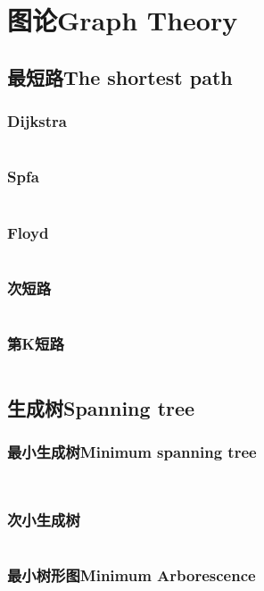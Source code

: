 \documentclass[twoside,sub3section,UTF8]{ctexart}						%
\begin{document}
\newpage
\section{图论Graph Theory}
	\subsection{最短路The shortest path}
		\subsubsection{Dijkstra}
		\inputminted[breaklines]{c++}{"Gragh Theory/The shortest path/dijkstra.cpp"}
		\subsubsection{Spfa}
		\inputminted[breaklines]{c++}{"Gragh Theory/The shortest path/spfa.cpp"}
		\subsubsection{Floyd}
		\inputminted[breaklines]{c++}{"Gragh Theory/The shortest path/floyd.cpp"}
		\subsubsection{次短路}
		\inputminted[breaklines]{c++}{"Gragh Theory/The shortest path/secdij.cpp"}
		\subsubsection{第K短路}
		\inputminted[breaklines]{c++}{"Gragh Theory/The shortest path/Astar.cpp"}

	\subsection{生成树Spanning tree}
		\subsubsection{最小生成树Minimum spanning tree}
		\inputminted[breaklines]{c++}{"Gragh Theory/MST/kruskal.cpp"}
		\inputminted[breaklines]{c++}{"Gragh Theory/MST/prim.cpp"}
		\subsubsection{次小生成树}
		\inputminted{c++}{"Gragh Theory/MST/secmst.cpp"}
		\subsubsection{最小树形图Minimum Arborescence}
		
\end{document}
